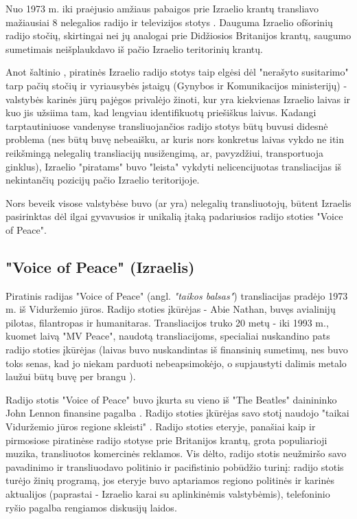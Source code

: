 \documentclass[kursinis-darbas]{vukf}
\begin{document}
Nuo 1973 m. iki praėjusio amžiaus pabaigos prie Izraelio krantų transliavo mažiausiai 8 nelegalios radijo ir televizijos stotys \cite{soundscapes_the_worlds_last_offshore_radio_stations}. Dauguma Izraelio ofšorinių radijo stočių, skirtingai nei jų analogai prie Didžiosios Britanijos krantų, saugumo sumetimais neišplaukdavo iš pačio Izraelio teritorinių krantų.

Anot šaltinio \cite{offshore_radio_israel}, piratinės Izraelio radijo stotys taip elgėsi dėl "nerašyto susitarimo" tarp pačių stočių ir vyriausybės įstaigų (Gynybos ir Komunikacijos ministerijų) - valstybės karinės jūrų pajėgos privalėjo žinoti, kur yra kiekvienas Izraelio laivas ir kuo jis užsiima tam, kad lengviau identifikuotų priešiškus laivus. Kadangi tarptautiniuose vandenyse transliuojančios radijo stotys būtų buvusi didesnė problema (nes būtų buvę nebeaišku, ar kuris nors konkretus laivas vykdo ne itin reikšmingą nelegalių transliacijų nusižengimą, ar, pavyzdžiui, transportuoja ginklus), Izraelio "piratams" buvo "leista" vykdyti nelicencijuotas transliacijas iš nekintančių pozicijų pačio Izraelio teritorijoje.

Nors beveik visose valstybėse buvo (ar yra) nelegalių transliuotojų, būtent Izraelis pasirinktas dėl ilgai gyvavusios ir unikalią įtaką padariusios radijo stoties "Voice of Peace".

\subsection{"Voice of Peace" (Izraelis)}

Piratinis radijas "Voice of Peace" (angl. \emph{"taikos balsas"}) transliacijas pradėjo 1973 m. iš Viduržemio jūros. Radijo stoties įkūrėjas - Abie Nathan, buvęs avialinijų pilotas, filantropas ir humanitaras. Transliacijos truko 20 metų - iki 1993 m., kuomet laivą "MV Peace", naudotą transliacijoms, specialiai nuskandino pats radijo stoties įkūrėjas \cite{soundscapes_voice_of_peace} (laivas buvo nuskandintas iš finansinių sumetimų, nes buvo toks senas, kad jo niekam parduoti nebeapsimokėjo, o supjaustyti dalimis metalo laužui būtų buvę per brangu \cite{soundscapes_the_worlds_last_offshore_radio_stations}).

Radijo stotis "Voice of Peace" buvo įkurta su vieno iš "The Beatles" dainininko John Lennon finansine pagalba \cite{soundscapes_talking_peace_in_new_york}. Radijo stoties įkūrėjas savo stotį naudojo "taikai Viduržemio jūros regione skleisti" \cite{soundscapes_abie_nathans_peace_programme}. Radijo stoties eteryje, panašiai kaip ir pirmosiose piratinėse radijo stotyse prie Britanijos krantų, grota populiarioji muzika, transliuotos komercinės reklamos. Vis dėlto, radijo stotis neužmiršo savo pavadinimo ir transliuodavo politinio ir pacifistinio pobūdžio turinį: radijo stotis turėjo žinių programą, jos eteryje buvo aptariamos regiono politinės ir karinės aktualijos (paprastai - Izraelio karai su aplinkinėmis valstybėmis), telefoninio ryšio pagalba rengiamos diskusijų laidos.
\end{document}
